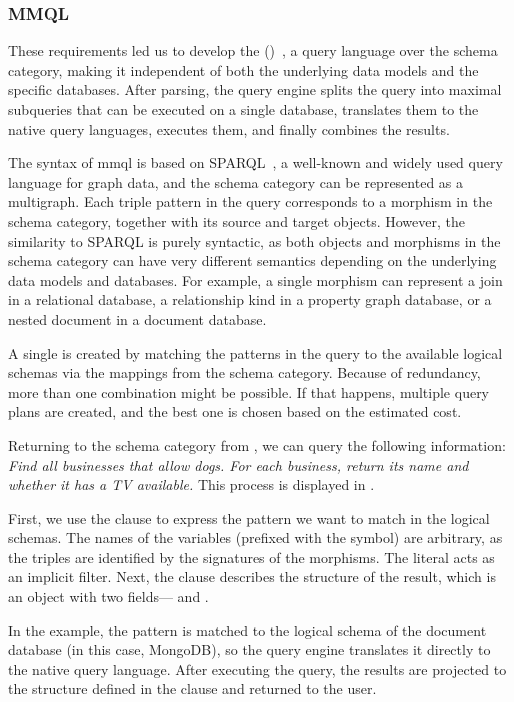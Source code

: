\subsubsection{MMQL}

These requirements led us to develop the  ()~\citep{mm_quecat, koupil2023universal}, a query language over the schema category, making it independent of both the underlying data models and the specific databases. After parsing, the query engine splits the query into maximal subqueries that can be executed on a single database, translates them to the native query languages, executes them, and finally combines the results.

The syntax of \acrshort{mmql} is based on SPARQL~\citep{sparql}, a well-known and widely used query language for graph data, and the schema category can be represented as a multigraph. Each triple pattern in the query corresponds to a morphism in the schema category, together with its source and target objects. However, the similarity to SPARQL is purely syntactic, as both objects and morphisms in the schema category can have very different semantics depending on the underlying data models and databases. For example, a single morphism can represent a join in a relational database, a relationship kind in a property graph database, or a nested document in a document database.

A single  is created by matching the patterns in the query to the available logical schemas via the mappings from the schema category. Because of redundancy, more than one combination might be possible. If that happens, multiple query plans are created, and the best one is chosen based on the estimated cost.

\begin{example}
\label{ex:querying-single}
Returning to the schema category from , we can query the following information: \emph{Find all businesses that allow dogs. For each business, return its name and whether it has a TV available.} This process is displayed in .

First, we use the  clause to express the pattern we want to match in the logical schemas. The names of the variables (prefixed with the  symbol) are arbitrary, as the triples are identified by the signatures of the morphisms. The  literal acts as an implicit filter. Next, the  clause describes the structure of the result, which is an object with two fields--- and .

In the example, the  pattern is matched to the logical schema of the document database (in this case, MongoDB), so the query engine translates it directly to the native query language. After executing the query, the results are projected to the structure defined in the  clause and returned to the user.
\end{example}


